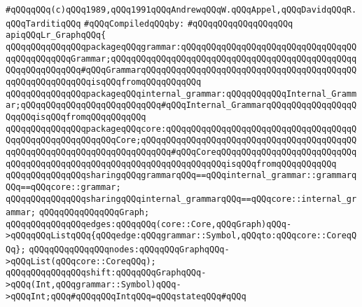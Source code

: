 \label{src/app/yacc/src/lr-graph.api}
\verb|#qQQqqQQq(c)qQQq1989,qQQq1991qQQqAndrewqQQqW.qQQqAppel,qQQqDavidqQQqR.qQQqTarditiqQQq|\newline
\newline
\verb|#qQQqCompiledqQQqby:|\newline
\verb|#qQQqqQQqqQQqqQQqqQQq|\newline
\newline
\verb|apiqQQqLr_GraphqQQq{|\newline
\newline
\verb|qQQqqQQqqQQqqQQqpackageqQQqgrammar:qQQqqQQqqQQqqQQqqQQqqQQqqQQqqQQqqQQqqQQqqQQqqQQqGrammar;qQQqqQQqqQQqqQQqqQQqqQQqqQQqqQQqqQQqqQQqqQQqqQQqqQQqqQQqqQQqqQQq#qQQqGrammarqQQqqQQqqQQqqQQqqQQqqQQqqQQqqQQqqQQqqQQqqQQqqQQqqQQqqQQqqQQqisqQQqfromqQQqqQQqqQQq|\newline
\verb|qQQqqQQqqQQqqQQqpackageqQQqinternal_grammar:qQQqqQQqqQQqInternal_Grammar;qQQqqQQqqQQqqQQqqQQqqQQqqQQq#qQQqInternal_GrammarqQQqqQQqqQQqqQQqqQQqqQQqisqQQqfromqQQqqQQqqQQq|\newline
\verb|qQQqqQQqqQQqqQQqpackageqQQqcore:qQQqqQQqqQQqqQQqqQQqqQQqqQQqqQQqqQQqqQQqqQQqqQQqqQQqqQQqqQQqCore;qQQqqQQqqQQqqQQqqQQqqQQqqQQqqQQqqQQqqQQqqQQqqQQqqQQqqQQqqQQqqQQqqQQqqQQqqQQq#qQQqCoreqQQqqQQqqQQqqQQqqQQqqQQqqQQqqQQqqQQqqQQqqQQqqQQqqQQqqQQqqQQqqQQqqQQqqQQqisqQQqfromqQQqqQQqqQQq|\newline
\newline
\verb|qQQqqQQqqQQqqQQqsharingqQQqgrammarqQQq==qQQqinternal_grammar::grammarqQQq==qQQqcore::grammar;|\newline
\verb|qQQqqQQqqQQqqQQqsharingqQQqinternal_grammarqQQq==qQQqcore::internal_grammar;|\newline
\newline
\verb|qQQqqQQqqQQqqQQqGraph;|\newline
\newline
\verb|qQQqqQQqqQQqqQQqedges:qQQqqQQq(core::Core,qQQqGraph)qQQq->qQQqqQQqListqQQq{qQQqedge:qQQqgrammar::Symbol,qQQqto:qQQqcore::CoreqQQq};|\newline
\verb|qQQqqQQqqQQqqQQqnodes:qQQqqQQqGraphqQQq->qQQqList(qQQqcore::CoreqQQq);|\newline
\verb|qQQqqQQqqQQqqQQqshift:qQQqqQQqGraphqQQq->qQQq(Int,qQQqgrammar::Symbol)qQQq->qQQqInt;qQQq#qQQqqQQqIntqQQq=qQQqstateqQQq#qQQq|\newline
